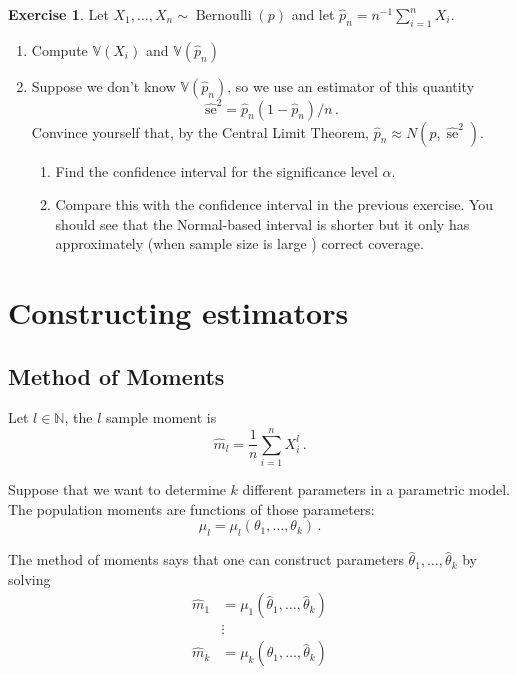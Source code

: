 \documentclass[
  openany]{book}
\theoremstyle{definition}
\theoremstyle{definition}
\theoremstyle{definition}
\newtheorem{exercise}{Exercise}[chapter]
\theoremstyle{definition}
\theoremstyle{remark}
\begin{document}
\begin{exercise}

Let \(X_1, \ldots, X_n \sim \operatorname{Bernoulli}(p)\) and let \(\widehat{p}_n=n^{-1} \sum_{i=1}^n X_i\).

\begin{enumerate}
\def\labelenumi{\arabic{enumi}.}
\item
  Compute \(\mathbb{V}( X_i)\) and \(\mathbb{V}(\hat p_n)\)
\item
  Suppose we don't know \(\mathbb{V}(\hat p_n)\), so we use an estimator of this quantity
  \[\widehat{\mathrm{se}}^2 = {\widehat{p}_n\left(1-\widehat{p}_n\right) / n} \,.\]
  Convince yourself that, by the Central Limit Theorem, \(\widehat{p}_n \approx N\left(p, \widehat{\operatorname{se}}^2\right)\).

  \begin{enumerate}
  \def\labelenumii{\arabic{enumii}.}
  \item
    Find the confidence interval for the significance level \(\alpha\).
  \item
    Compare this with the confidence interval in the previous exercise.
    You should see that the Normal-based interval is shorter but it only has approximately (when sample size is large ) correct coverage.
  \end{enumerate}
\end{enumerate}

\end{exercise}

\section{Constructing estimators}\label{constructing-estimators}

\subsection{Method of Moments}\label{method-of-moments}

Let \(l \in \mathbb{N}\), the \(l\) sample moment is
\[
   \hat m_l = \frac 1 n \sum_{i=1}^n X_i^l \,.
\]

Suppose that we want to determine \(k\) different parameters in a parametric model.
The population moments are functions of those parameters:
\[
 \mu_l = \mu_l (\theta_1, \dots, \theta_k) \,.
\]

The method of moments says that one can construct parameters \(\hat \theta_1, \dots, \hat \theta_k\) by solving
\begin{equation}
    \begin{aligned}
        \hat m_1 &= \mu_1 (\hat \theta_1, \dots, \hat \theta_k) \\
        &\vdots\\
        \hat m_k &= \mu_k (\hat \theta_1, \dots, \hat \theta_k) \\
    \end{aligned}
        \label{eq:moments}
\end{equation}
\end{document}

